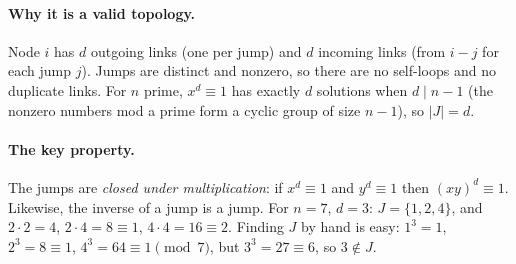 \documentclass[11pt]{article}
\theoremstyle{definition}
\begin{document}
\paragraph{Why it is a valid topology.} Node $i$ has $d$ outgoing links (one per jump) and $d$ incoming links (from
$i-j$ for each jump $j$). Jumps are distinct and nonzero, so there are no self-loops and no duplicate links. For $n$
prime, $x^d \equiv 1$ has exactly $d$ solutions when $d \mid n-1$ (the nonzero numbers mod a prime form a cyclic group
of size $n-1$), so $|J| = d$.

\paragraph{The key property.} The jumps are \emph{closed under multiplication}: if $x^d \equiv 1$ and $y^d \equiv 1$ then
$(xy)^d \equiv 1$. Likewise, the inverse of a jump is a jump. For $n=7$, $d=3$: $J=\{1,2,4\}$, and
$2\cdot 2=4$, $2\cdot4=8\equiv1$, $4\cdot4=16\equiv2$. Finding $J$ by hand is easy: $1^3=1$, $2^3=8\equiv1$,
$4^3=64\equiv1 \pmod 7$, but $3^3 = 27 \equiv 6$, so $3 \notin J$.
\end{document}
